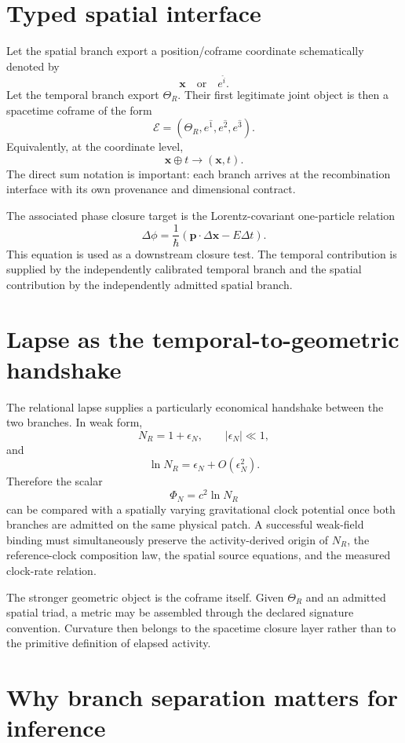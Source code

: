\section{Typed spatial interface}

Let the spatial branch export a position/coframe coordinate schematically denoted by
\[
\mathbf x
\quad\text{or}\quad
e^{\hat i}.
\]
Let the temporal branch export \(\Theta_R\). Their first legitimate joint object is then a spacetime coframe of the form
\[
\boxed{
\mathcal E
=
\left(\Theta_R,e^{\hat1},e^{\hat2},e^{\hat3}\right).
}
\]
Equivalently, at the coordinate level,
\[
\boxed{
\mathbf x\oplus t
\longrightarrow
(\mathbf x,t).
}
\]
The direct sum notation is important: each branch arrives at the recombination interface with its own provenance and dimensional contract.

The associated phase closure target is the Lorentz-covariant one-particle relation
\[
\boxed{
\Delta\phi
=
\frac{1}{\hbar}
\left(\mathbf p\cdot\Delta\mathbf x-E\Delta t\right).
}
\]
This equation is used as a downstream closure test. The temporal contribution is supplied by the independently calibrated temporal branch and the spatial contribution by the independently admitted spatial branch.

\section{Lapse as the temporal-to-geometric handshake}

The relational lapse supplies a particularly economical handshake between the two branches. In weak form,
\[
N_R=1+\epsilon_N,
\qquad
|\epsilon_N|\ll1,
\]
and
\[
\ln N_R=\epsilon_N+O(\epsilon_N^2).
\]
Therefore the scalar
\[
\Phi_N=c^2\ln N_R
\]
can be compared with a spatially varying gravitational clock potential once both branches are admitted on the same physical patch. A successful weak-field binding must simultaneously preserve the activity-derived origin of \(N_R\), the reference-clock composition law, the spatial source equations, and the measured clock-rate relation.

The stronger geometric object is the coframe itself. Given \(\Theta_R\) and an admitted spatial triad, a metric may be assembled through the declared signature convention. Curvature then belongs to the spacetime closure layer rather than to the primitive definition of elapsed activity.

\section{Why branch separation matters for inference}


